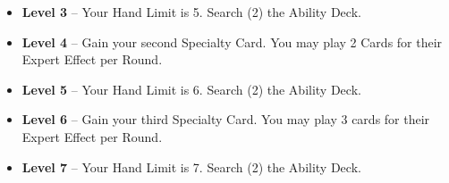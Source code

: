 \begin{multicols}{2}
\begin{itemize}
\item \textbf{Level 3} – Your Hand Limit is 5.
Search (2) the Ability Deck.
\item \textbf{Level 4} – Gain your second Specialty Card.
You may play 2 Cards for their Expert Effect per Round.
\item \textbf{Level 5} – Your Hand Limit is 6.
Search (2) the Ability Deck.
\item \textbf{Level 6} – Gain your third Specialty Card.
You may play 3 cards for their Expert Effect per Round.
\item \textbf{Level 7} – Your Hand Limit is 7.
Search (2) the Ability Deck.
\end{itemize}

\end{multicols}


